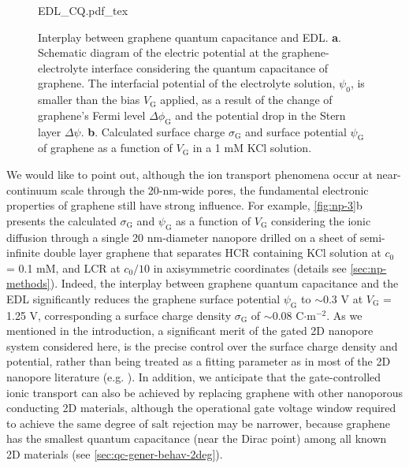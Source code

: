 %
\begin{figure}[!htbp]
  \centering
  {EDL_CQ.pdf_tex}
  \caption{Interplay between graphene quantum capacitance and
    EDL. \textbf{a}. Schematic diagram of the electric potential at
    the graphene-electrolyte interface considering the quantum
    capacitance of graphene. The interfacial potential of the
    electrolyte solution, $\psi_{0}$, is smaller than the bias
    $V_{\mathrm{G}}$ applied, as a result of the change of graphene's
    Fermi level $\Delta \phi_{\mathrm{G}}$ and the potential drop in
    the Stern layer $\Delta \psi$. \textbf{b}. Calculated surface
    charge $\sigma_{\mathrm{G}}$ and surface potential
    $\psi_{\mathrm{G}}$ of graphene as a function of $V_{\mathrm{G}}$
    in a 1 mM KCl solution. }
  \label{fig:np-3}
\end{figure}
We would like to point out, although the ion transport phenomena occur
at near-continuum scale through the 20-nm-wide pores, the fundamental
electronic properties of graphene still have strong influence.
%
For example, \autoref{fig:np-3}b presents the calculated
$\sigma_{\mathrm{G}}$ and $\psi_{\mathrm{G}}$ as a function of
$V_{\mathrm{G}}$ considering the ionic diffusion through a single 20
nm-diameter nanopore drilled on a sheet of semi-infinite double layer
graphene that separates HCR containing KCl solution at $c_{0}$ = 0.1
mM, and LCR at $c_{0}/10$ in axisymmetric coordinates (details see
\autoref{sec:np-methods}). Indeed, the interplay between graphene
quantum capacitance and the EDL significantly reduces the graphene
surface potential $\psi_{\mathrm{G}}$ to $\sim$0.3 V at
$V_{\mathrm{G}}$ = 1.25 V, corresponding a surface charge density
$\sigma_{\mathrm{G}}$ of $\sim$0.08 C$\cdot$m$^{-2}$.  As we mentioned
in the introduction, a significant merit of the gated 2D nanopore
system considered here, is the precise control over the surface charge
density and potential, rather than being treated as a fitting
parameter as in most of the 2D nanopore literature
(e.g. \autocite{Rollings_2016_gating}).
%
In addition, we anticipate that the gate-controlled ionic transport
can also be achieved by replacing graphene with other nanoporous
conducting 2D materials, although the operational gate voltage window
required to achieve the same degree of salt rejection may be narrower,
because graphene has the smallest quantum capacitance (near the Dirac
point) among all known 2D materials (see
\autoref{sec:qc-gener-behav-2deg}).

